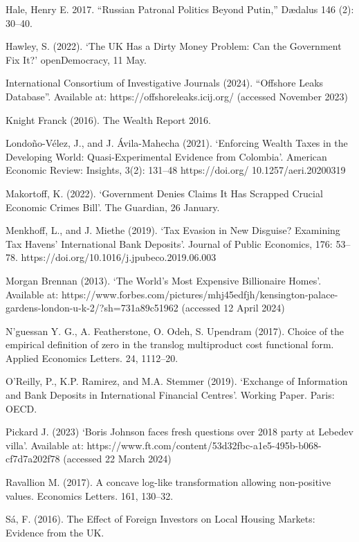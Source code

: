 \documentclass{article}
\begin{document}
\begin{thebibliography}{x}
\bibitem{}
Hale, Henry E. 2017. “Russian Patronal Politics Beyond Putin,” Dædalus 146 (2): 30–40. 

\bibitem{}
Hawley, S. (2022). ‘The UK Has a Dirty Money Problem: Can the Government Fix It?’ openDemocracy, 11 May.

\bibitem{}
International Consortium of Investigative Journals (2024). “Offshore Leaks Database”. Available at: https://offshoreleaks.icij.org/ (accessed November 2023)


\bibitem{}
Knight Franck (2016). The Wealth Report 2016.

\bibitem{}
Londoño-Vélez, J., and J. Ávila-Mahecha (2021). ‘Enforcing Wealth Taxes in the Developing World: Quasi-Experimental Evidence from Colombia’. American Economic Review: Insights, 3(2): 131–48 https://doi.org/ 10.1257/aeri.20200319

\bibitem{}
Makortoff, K. (2022). ‘Government Denies Claims It Has Scrapped Crucial Economic Crimes Bill’. The Guardian, 26 January.

\bibitem{}
Menkhoff, L., and J. Miethe (2019). ‘Tax Evasion in New Disguise? Examining Tax Havens’ International Bank Deposits’. Journal of Public Economics, 176: 53–78. https://doi.org/10.1016/j.jpubeco.2019.06.003

\bibitem{}
Morgan Brennan (2013). ‘The World’s Most Expensive Billionaire Homes’. Available at: https://www.forbes.com/pictures/mhj45edfjh/kensington-palace-gardens-london-u-k-2/?sh=731a89c51962 (accessed 12 April 2024)

\bibitem{}
N’guessan Y. G., A. Featherstone, O. Odeh, S. Upendram (2017). Choice of the empirical definition of zero in the translog multiproduct cost functional form. Applied Economics Letters. 24, 1112–20.

\bibitem{}
O’Reilly, P., K.P. Ramirez, and M.A. Stemmer (2019). ‘Exchange of Information and Bank Deposits in International Financial Centres’. Working Paper. Paris: OECD.

\bibitem{}
Pickard J. (2023) ‘Boris Johnson faces fresh questions over 2018 party at Lebedev villa’. Available at: https://www.ft.com/content/53d32fbc-a1e5-495b-b068-cf7d7a202f78 (accessed 22 March 2024)

\bibitem{}
Ravallion M. (2017). A concave log-like transformation allowing non-positive values. Economics Letters. 161, 130–32.

\bibitem{}
Sá, F. (2016). The Effect of Foreign Investors on Local Housing Markets: Evidence from the UK.


\end{thebibliography}
\end{document}
